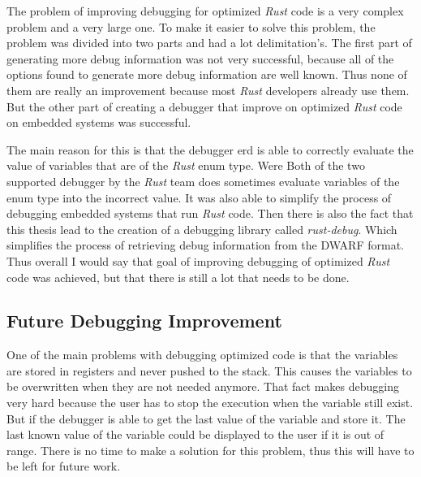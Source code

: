 
The problem of improving debugging for optimized \emph{Rust} code is a very complex problem and a very large one.
To make it easier to solve this problem, the problem was divided into two parts and had a lot delimitation's.
The first part of generating more debug information was not very successful, because all of the options found to generate more debug information are well known.
Thus none of them are really an improvement because most \emph{Rust} developers already use them.
But the other part of creating a debugger that improve on optimized \emph{Rust} code on embedded systems was successful.


The main reason for this is that the debugger \gls{erd} is able to correctly evaluate the value of variables that are of the \emph{Rust} enum type.
Were Both of the two supported debugger by the \emph{Rust} team does sometimes evaluate variables of the enum type into the incorrect value.
It was also able to simplify the process of debugging embedded systems that run \emph{Rust} code.
Then there is also the fact that this thesis lead to the creation of a debugging library called \emph{rust-debug}.
Which simplifies the process of retrieving debug information from the \gls{DWARF} format.
Thus overall I would say that goal of improving debugging of optimized \emph{Rust} code was achieved, but that there is still a lot that needs to be done.


\subsection{Future Debugging Improvement}
One of the main problems with debugging optimized code is that the variables are stored in registers and never pushed to the stack.
This causes the variables to be overwritten when they are not needed anymore.
That fact makes debugging very hard because the user has to stop the execution when the variable still exist.
But if the debugger is able to get the last value of the variable and store it.
The last known value of the variable could be displayed to the user if it is out of range.
There is no time to make a solution for this problem, thus this will have to be left for future work.


